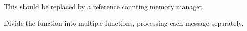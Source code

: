 
\begin{DoxyRefList}
\item[\label{todo__todo000001}%
\hypertarget{todo__todo000001}{}%
Member \hyperlink{class_client_manager_abac29dfed67c8b8354cf07267fd5515b}{Client\-Manager\-:\-:$\sim$\-Client\-Manager} (void)]This should be replaced by a reference counting memory manager.  
\item[\label{todo__todo000002}%
\hypertarget{todo__todo000002}{}%
Member \hyperlink{class_control_manager_a2dc55da1b01fd175b3d885c68b8a7524}{Control\-Manager\-:\-:Process\-Data} (void $\ast$data, const size\-\_\-t size)]Divide the function into multiple functions, processing each message separately.
\end{DoxyRefList}